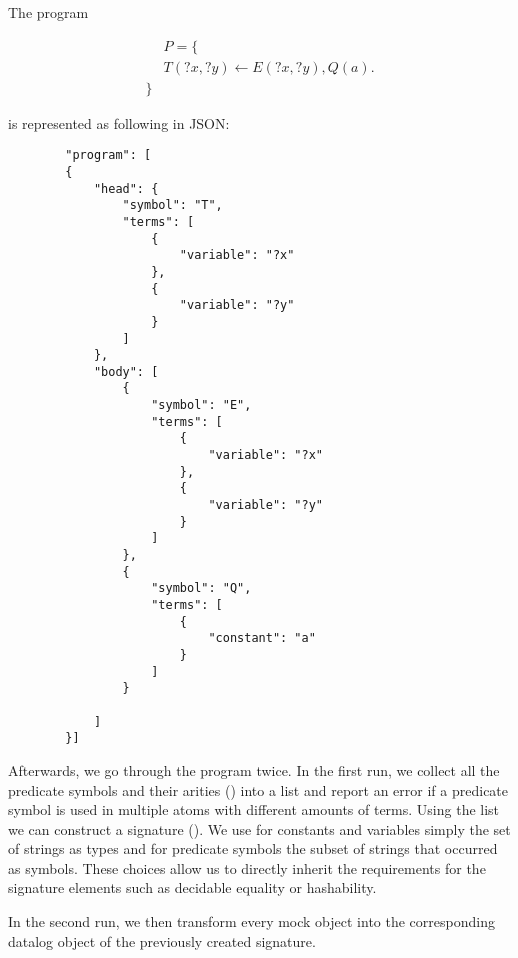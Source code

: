 \begin{example}
    The program 

    \begin{equation}
        \begin{split}
            &P = \{  \\
            &T(?x,?y) \leftarrow E(?x,?y), Q(a).\\
            \}
        \end{split}
    \end{equation}

    is represented as following in JSON:

    \begin{lstlisting}
        "program": [
        {
            "head": {
                "symbol": "T",
                "terms": [
                    {
                        "variable": "?x"
                    },
                    {
                        "variable": "?y"
                    }
                ]
            },
            "body": [
                {
                    "symbol": "E",
                    "terms": [
                        {
                            "variable": "?x"
                        },
                        {
                            "variable": "?y"
                        }
                    ]
                },
                {
                    "symbol": "Q",
                    "terms": [
                        {
                            "constant": "a"
                        }
                    ]
                }

            ]
        }]
    \end{lstlisting}
\end{example}

Afterwards, we go through the program twice. In the first run, we collect all the predicate symbols and their arities (\parsingArityHelper) into a list and report an error if a predicate symbol is used in multiple atoms with different amounts of terms. Using the list we can construct a signature (\parsingSignature). We use for constants and variables simply the set of strings as types and for predicate symbols the subset of strings that occurred as symbols. These choices allow us to directly inherit the requirements for the signature elements such as decidable equality or hashability. 

In the second run, we then transform every mock object into the corresponding datalog object of the previously created signature. 

